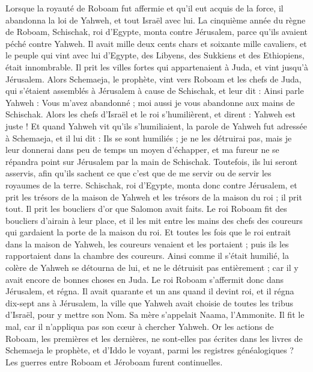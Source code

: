 \begin{multicols}{2}
\VerseOne{}Lorsque la royauté de Roboam fut affermie et qu'il eut acquis de la force, il abandonna la loi de Yahweh, et tout Israël avec lui.
La cinquième année du règne de Roboam, Schischak, roi d'Egypte, monta contre Jérusalem, parce qu'ils avaient péché contre Yahweh.
Il avait mille deux cents chars et soixante mille cavaliers, et le peuple qui vint avec lui d'Egypte, des Libyens, des Sukkiens et des Ethiopiens, était innombrable.
Il prit les villes fortes qui appartenaient à Juda, et vint jusqu'à Jérusalem.
Alors Schemaeja, le prophète, vint vers Roboam et les chefs de Juda, qui s'étaient assemblés à Jérusalem à cause de Schischak, et leur dit : Ainsi parle Yahweh : Vous m'avez abandonné ; moi aussi je vous abandonne aux mains de Schischak.
Alors les chefs d'Israël et le roi s'humilièrent, et dirent : Yahweh est juste !
Et quand Yahweh vit qu'ils s'humiliaient, la parole de Yahweh fut adressée à Schemaeja, et il lui dit : Ils se sont humiliés ; je ne les détruirai pas, mais je leur donnerai dans peu de temps un moyen d'échapper, et ma fureur ne se répandra point sur Jérusalem par la main de Schischak.
Toutefois, ils lui seront asservis, afin qu'ils sachent ce que c'est que de me servir ou de servir les royaumes de la terre.
Schischak, roi d'Egypte, monta donc contre Jérusalem, et prit les trésors de la maison de Yahweh et les trésors de la maison du roi ; il prit tout. Il prit les boucliers d'or que Salomon avait faits.
Le roi Roboam fit des boucliers d'airain à leur place, et il les mit entre les mains des chefs des coureurs qui gardaient la porte de la maison du roi.
Et toutes les fois que le roi entrait dans la maison de Yahweh, les coureurs venaient et les portaient ; puis ils les rapportaient dans la chambre des coureurs.
Ainsi comme il s'était humilié, la colère de Yahweh se détourna de lui, et ne le détruisit pas entièrement ; car il y avait encore de bonnes choses en Juda.
Le roi Roboam s'affermit donc dans Jérusalem, et régna. Il avait quarante et un ans quand il devint roi, et il régna dix-sept ans à Jérusalem, la ville que Yahweh avait choisie de toutes les tribus d'Israël, pour y mettre son Nom. Sa mère s'appelait Naama, l'Ammonite.
Il fit le mal, car il n'appliqua pas son cœur à chercher Yahweh.
Or les actions de Roboam, les premières et les dernières, ne sont-elles pas écrites dans les livres de Schemaeja le prophète, et d'Iddo le voyant, parmi les registres généalogiques ? Les guerres entre Roboam et Jéroboam furent continuelles.

\end{multicols}
